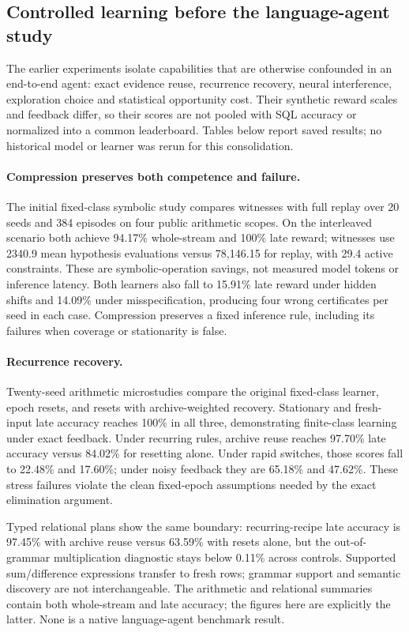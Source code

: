\documentclass[10pt,twocolumn]{article}
\begin{document}
\subsection{Controlled learning before the language-agent study}\label{sec:historical}
The earlier experiments isolate capabilities that are otherwise confounded in
an end-to-end agent: exact evidence reuse, recurrence recovery, neural
interference, exploration choice and statistical opportunity cost. Their
synthetic reward scales and feedback differ, so their scores are not pooled
with SQL accuracy or normalized into a common leaderboard. Tables below report
saved results; no historical model or learner was rerun for this consolidation.

\paragraph{Compression preserves both competence and failure.}
The initial fixed-class symbolic study compares witnesses with full replay over
20 seeds and 384 episodes on four public arithmetic scopes. On the interleaved
scenario both achieve 94.17\% whole-stream and 100\% late reward; witnesses
use 2340.9 mean hypothesis evaluations versus 78,146.15 for replay, with 29.4
active constraints. These are symbolic-operation savings, not measured model
tokens or inference latency. Both learners also fall to 15.91\% late reward
under hidden shifts and 14.09\% under misspecification, producing four wrong
certificates per seed in each case. Compression preserves a fixed inference
rule, including its failures when coverage or stationarity is false.

\paragraph{Recurrence recovery.}
Twenty-seed arithmetic microstudies compare the original fixed-class learner,
epoch resets, and resets with archive-weighted recovery. Stationary and fresh-
input late accuracy reaches 100\% in all three, demonstrating finite-class
learning under exact feedback. Under recurring rules, archive reuse reaches
97.70\% late accuracy versus 84.02\% for resetting alone. Under rapid switches,
those scores fall to 22.48\% and 17.60\%; under noisy feedback they are 65.18\%
and 47.62\%. These stress failures violate the clean fixed-epoch assumptions
needed by the exact elimination argument.

Typed relational plans show the same boundary: recurring-recipe late accuracy
is 97.45\% with archive reuse versus 63.59\% with resets alone, but the
out-of-grammar multiplication diagnostic stays below 0.11\% across controls.
Supported sum/difference expressions transfer to fresh rows; grammar support
and semantic discovery are not interchangeable. The arithmetic and relational
summaries contain both whole-stream and late accuracy; the figures here are
explicitly the latter. None is a native language-agent benchmark result.
\end{document}
